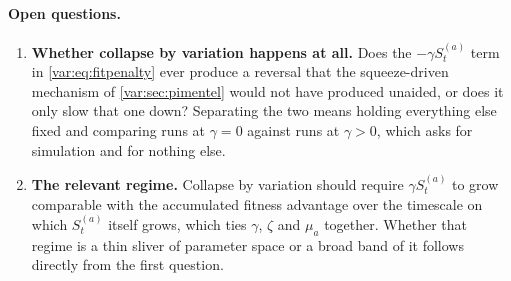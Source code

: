 \paragraph{Open questions.}\label{var:rem:open-plus}
\begin{enumerate}[leftmargin=1.6em,itemsep=0.2em,topsep=0.2em]
\item \textbf{Whether collapse by variation happens at all.} Does the
$-\gamma S^{(a)}_t$ term in \cref{var:eq:fitpenalty} ever produce a reversal
that the squeeze-driven mechanism of \cref{var:sec:pimentel} would not have
produced unaided, or does it only slow that one down? Separating the two
means holding everything else fixed and comparing runs at $\gamma=0$ against
runs at $\gamma>0$, which asks for simulation and for nothing else.
\item \textbf{The relevant regime.} Collapse by variation should require
$\gamma S^{(a)}_t$ to grow comparable with the accumulated fitness advantage
over the timescale on which $S^{(a)}_t$ itself grows, which ties $\gamma$,
$\zeta$ and $\mu_a$ together. Whether that regime is a thin sliver of
parameter space or a broad band of it follows directly from the first
question.
\end{enumerate}

